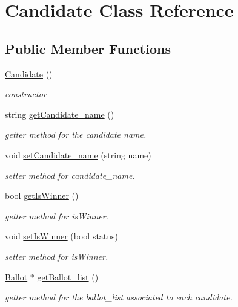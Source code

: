 \hypertarget{classCandidate}{}\section{Candidate Class Reference}
\label{classCandidate}
\subsection*{Public Member Functions}
\begin{DoxyCompactItemize}
\item 
\hyperlink{classCandidate_aa2747741fb662af5e8f3d01d1d1a43b6}{Candidate} ()
\begin{DoxyCompactList}\small\item\em constructor \end{DoxyCompactList}\item 
string \hyperlink{classCandidate_a237bf7b490670877c1994e3f971aeffe}{get\+Candidate\+\_\+name} ()
\begin{DoxyCompactList}\small\item\em getter method for the candidate name. \end{DoxyCompactList}\item 
void \hyperlink{classCandidate_a86d0f2ccec370c41834638a7fe0d7177}{set\+Candidate\+\_\+name} (string name)
\begin{DoxyCompactList}\small\item\em setter method for candidate\+\_\+name. \end{DoxyCompactList}\item 
bool \hyperlink{classCandidate_a33247235bb994930394a4b4f0bd6ef26}{get\+Is\+Winner} ()
\begin{DoxyCompactList}\small\item\em getter method for is\+Winner. \end{DoxyCompactList}\item 
void \hyperlink{classCandidate_a9adfa52fb4809e50f33342d9e63c7b74}{set\+Is\+Winner} (bool status)
\begin{DoxyCompactList}\small\item\em setter method for is\+Winner. \end{DoxyCompactList}\item 
\hyperlink{classBallot}{Ballot} $\ast$ \hyperlink{classCandidate_ae452752fe774b33d5bf80f6b89de768b}{get\+Ballot\+\_\+list} ()
\begin{DoxyCompactList}\small\item\em getter method for the ballot\+\_\+list associated to each candidate. \end{DoxyCompactList}\item 

\end{DoxyCompactItemize}
